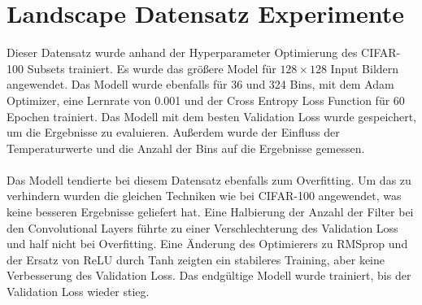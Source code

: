 \section{Landscape Datensatz Experimente}
Dieser Datensatz wurde anhand der Hyperparameter Optimierung des CIFAR-100 Subsets trainiert. Es wurde das größere Model für $128 \times 128$
Input Bildern angewendet. Das Modell wurde ebenfalls für 36 und 324 Bins, mit dem Adam Optimizer, eine Lernrate von 0.001 und der Cross Entropy 
Loss Function für 60 Epochen trainiert. Das Modell mit dem besten Validation Loss wurde gespeichert, um die Ergebnisse zu evaluieren. Außerdem
wurde der Einfluss der Temperaturwerte und die Anzahl der Bins auf die Ergebnisse gemessen.
\\
\\
Das Modell tendierte bei diesem Datensatz ebenfalls zum Overfitting. Um das zu verhindern wurden die gleichen Techniken wie bei CIFAR-100
angewendet, was keine besseren Ergebnisse geliefert hat. Eine Halbierung der Anzahl der Filter bei den Convolutional Layers führte zu einer Verschlechterung
des Validation Loss und half nicht bei Overfitting. Eine Änderung des Optimierers zu RMSprop und der Ersatz von ReLU durch Tanh zeigten
ein stabileres Training, aber keine Verbesserung des Validation Loss. Das endgültige Modell wurde trainiert, bis der Validation Loss wieder stieg.

